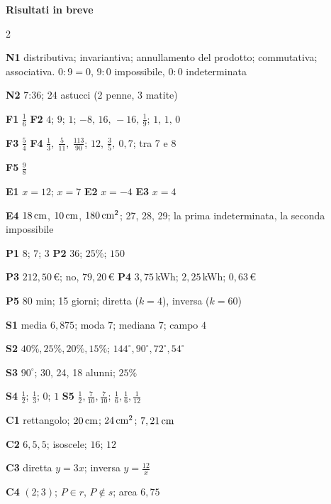 \begin{center}
{\large\bfseries\color{navy} Risultati in breve}
\end{center}
\vspace{-6pt}
{\footnotesize
\setlength{\columnsep}{14pt}
\begin{multicols}{2}
\raggedright
\textbf{N1} distributiva; invariantiva; annullamento del prodotto; commutativa; associativa. $0:9=0$, $9:0$ impossibile, $0:0$ indeterminata\par
\textbf{N2} 7:36; 24 astucci (2 penne, 3 matite)\par
\textbf{F1} $\frac16$ \quad \textbf{F2} $4$; $9$; $1$; $-8,\,16,\,-16,\,\frac19$; $1,\,1,\,0$\par
\textbf{F3} $\frac54$ \quad \textbf{F4} $\frac13,\ \frac{5}{11},\ \frac{113}{90}$; $12,\ \frac35,\ 0,7$; tra 7 e 8\par
\textbf{F5} $\frac98$\par
\textbf{E1} $x=12$; $x=7$ \quad \textbf{E2} $x=-4$ \quad \textbf{E3} $x=4$\par
\textbf{E4} $18\,\mathrm{cm}$, $10\,\mathrm{cm}$, $180\,\mathrm{cm^2}$; 27, 28, 29; la prima indeterminata, la seconda impossibile\par
\textbf{P1} $8$; $7$; $3$ \quad \textbf{P2} $36$; $25\%$; $150$\par
\textbf{P3} $212,50$\,€; no, $79,20$\,€ \quad \textbf{P4} $3,75$\,kWh; $2,25$\,kWh; $0,63$\,€\par
\textbf{P5} 80 min; 15 giorni; diretta ($k=4$), inversa ($k=60$)\par
\textbf{S1} media $6,875$; moda $7$; mediana $7$; campo $4$\par
\textbf{S2} $40\%,25\%,20\%,15\%$; $144^\circ,90^\circ,72^\circ,54^\circ$\par
\textbf{S3} $90^\circ$; 30, 24, 18 alunni; $25\%$\par
\textbf{S4} $\frac12$; $\frac13$; $0$; $1$ \quad \textbf{S5} $\frac12,\frac{7}{10},\frac{7}{10}$; $\frac16,\frac16,\frac{1}{12}$\par
\textbf{C1} rettangolo; $20\,\mathrm{cm}$; $24\,\mathrm{cm^2}$; $7,21\,\mathrm{cm}$\par
\textbf{C2} $6,5,5$; isoscele; $16$; $12$\par
\textbf{C3} diretta $y=3x$; inversa $y=\frac{12}{x}$\par
\textbf{C4} $(2;3)$; $P\in r$, $P\notin s$; area $6,75$\par

\end{multicols}}
